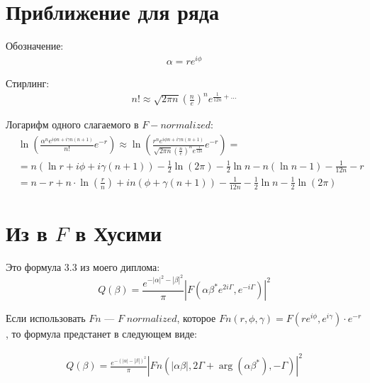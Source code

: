 \documentclass[a4paper, 12pt]{article}
\author{Нугманов Булат}
\begin{document}
\section*{Приближение для ряда}
Обозначение:
\begin{equation}
\begin{aligned}
    \alpha = r e^{i\phi}
\end{aligned}
\end{equation}

Стирлинг:
\begin{equation}
\begin{aligned}
    n! \approx \sqrt{2\pi n} \left(\frac{n}{e}\right)^n e^{\frac{1}{12n}+\dots}
\end{aligned}
\end{equation}

Логарифм одного слагаемого в $F-normalized$:
\begin{equation}
\begin{aligned}
    &\ln\left(\frac{\alpha^n e^{i\phi n + i\gamma n(n+1)}}{n!}e^{-r}\right)  \approx 
    \ln\left(\frac{r^n e^{i\phi n + i\gamma n(n+1)}}{\sqrt{2\pi n} \left(\frac{n}{e}\right)^n e^{\frac{1}{12n}}}e^{-r}\right) =\\
    &=n \left(\ln r + i \phi + i \gamma (n+1)\right) - \frac{1}{2}\ln\left(2\pi\right) 
    - \frac{1}{2}\ln n - n \left(\ln n - 1\right) - \frac{1}{12n} - r\\
    &=n-r + n\cdot\ln\left(\frac{r}{n}\right) + i n \left(\phi + \gamma(n+1)\right)
     -  \frac{1}{12n} - \frac{1}{2}\ln n - \frac{1}{2}\ln\left(2\pi\right) 
\end{aligned}
\end{equation}

\section*{Из в $F$ в Хусими}
Это формула 3.3 из моего диплома:
\begin{equation}\label{QsimF}
	Q(\beta) =
	\frac{e^{-|\alpha|^2 -|\beta|^2}}{\pi} \left|F(\alpha \beta^* e^{2 i \Gamma}, e^{-i \Gamma} )\right|^2
\end{equation}

Если использовать $Fn$ --- $F\; normalized$, которое $Fn(r, \phi, \gamma) = F(r e^{i\phi}, e^{i\gamma}) \cdot e^{-r}$, то формула предстанет в следующем виде:

\begin{equation}
\begin{aligned}
    Q(\beta) = \frac{e^{-\left(|\alpha|-|\beta|\right)^2}}{\pi}\left|Fn(|\alpha\beta|, 2 \Gamma + \arg\left(\alpha\beta^*\right), -\Gamma)\right|^2
\end{aligned}
\end{equation}
\end{document}
